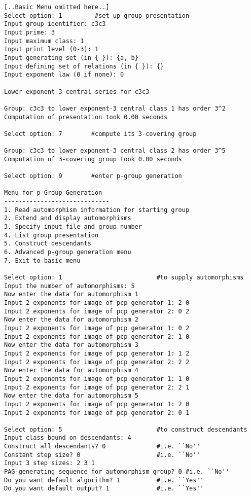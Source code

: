 \documentclass[12pt]{article}
\begin{document}
\begin{verbatim}
[..Basic Menu omitted here..]
Select option: 1         #set up group presentation
Input group identifier: c3c3
Input prime: 3
Input maximum class: 1
Input print level (0-3): 1
Input generating set (in { }): {a, b}
Input defining set of relations (in { }): {}
Input exponent law (0 if none): 0

Lower exponent-3 central series for c3c3

Group: c3c3 to lower exponent-3 central class 1 has order 3^2
Computation of presentation took 0.00 seconds

Select option: 7        #compute its 3-covering group 

Group: c3c3 to lower exponent-3 central class 2 has order 3^5
Computation of 3-covering group took 0.00 seconds

Select option: 9        #enter p-group generation 

Menu for p-Group Generation
-----------------------------
1. Read automorphism information for starting group
2. Extend and display automorphisms
3. Specify input file and group number
4. List group presentation
5. Construct descendants
6. Advanced p-group generation menu
7. Exit to basic menu

Select option: 1                          #to supply automorphisms 
Input the number of automorphisms: 5
Now enter the data for automorphism 1
Input 2 exponents for image of pcp generator 1: 2 0
Input 2 exponents for image of pcp generator 2: 0 2
Now enter the data for automorphism 2
Input 2 exponents for image of pcp generator 1: 0 2
Input 2 exponents for image of pcp generator 2: 1 0
Now enter the data for automorphism 3
Input 2 exponents for image of pcp generator 1: 1 2
Input 2 exponents for image of pcp generator 2: 2 2 
Now enter the data for automorphism 4
Input 2 exponents for image of pcp generator 1: 1 0
Input 2 exponents for image of pcp generator 2: 2 1
Now enter the data for automorphism 5
Input 2 exponents for image of pcp generator 1: 2 0
Input 2 exponents for image of pcp generator 2: 0 1

Select option: 5                          #to construct descendants
Input class bound on descendants: 4
Construct all descendants? 0              #i.e. ``No''
Constant step size? 0                     #i.e. ``No''
Input 3 step sizes: 2 3 1
PAG-generating sequence for automorphism group? 0 #i.e. ``No''
Do you want default algorithm? 1          #i.e. ``Yes''
Do you want default output? 1             #i.e. ``Yes''


\end{verbatim}
\end{document}
